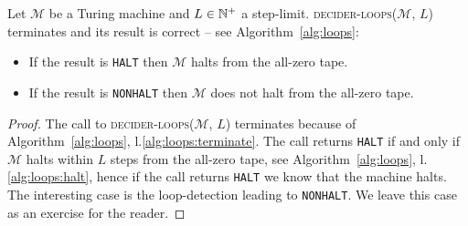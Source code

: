 \begin{theorem}\label{th:loops}
    Let $\mathcal{M}$ be a Turing machine and $L \in \mathbb{N}^+$ a step-limit. \textsc{decider-loops}($\mathcal{M}$, $L$) terminates and its result is correct -- see Algorithm~\ref{alg:loops}:
    \begin{itemize}
        \item If the result is \texttt{HALT} then $\mathcal{M}$ halts from the all-zero tape.
        \item If the result is \texttt{NONHALT} then $\mathcal{M}$ does not halt from the all-zero tape.
    \end{itemize}
\end{theorem}
\begin{proof}
    The call to \textsc{decider-loops}($\mathcal{M}$, $L$) terminates because of Algorithm~\ref{alg:loops}, l.\ref{alg:loops:terminate}. The call returns \texttt{HALT} if and only if $\mathcal{M}$ halts within $L$ steps from the all-zero tape, see Algorithm~\ref{alg:loops}, l.\ref{alg:loops:halt}, hence if the call returns \texttt{HALT} we know that the machine halts. The interesting case is the loop-detection leading to \texttt{NONHALT}. We leave this case as an exercise for the reader.



\end{proof}
